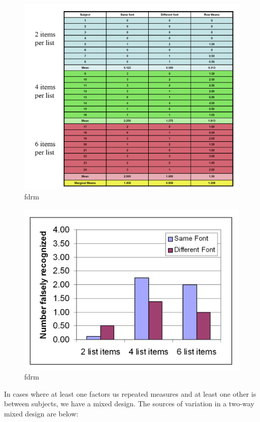 \documentclass[]{book}
\theoremstyle{definition}
\theoremstyle{definition}
\theoremstyle{definition}
\theoremstyle{remark}
\begin{document}
\begin{figure}
\centering
\includegraphics{img/hicksfdrm5.png}
\caption{fdrm}
\end{figure}

\begin{figure}
\centering
\includegraphics{img/hicksfdrm6.png}
\caption{fdrm}
\end{figure}

In cases where at least one factors us repeated measures and at least
one other is between subjects, we have a mixed design. The sources of
variation in a two-way mixed design are below:
\end{document}
